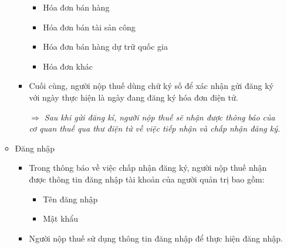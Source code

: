 \begin{itemize}
\begin{itemize}
\begin{itemize}
\begin{itemize}
                                  \item Hóa đơn bán hàng

                                  \item Hóa đơn bán tài sản công

                                  \item Hóa đơn bán hàng dự trữ quốc gia

                                  \item Hóa đơn khác


                              \end{itemize}

                        \item Cuối cùng, người nộp thuế dùng chữ ký số để xác nhận gửi đăng ký với ngày thực hiện là ngày đang đăng ký hóa đơn điện tử.

                              $\Rightarrow$ \emph{Sau khi gửi đăng kí, người nộp thuế sẽ nhận được thông báo của cơ quan thuế qua thư điện tử về việc tiếp nhận và chấp nhận đăng ký.}


                    \end{itemize}

              \item Đăng nhập

                    \begin{itemize}

                        \item Trong thông báo về việc chấp nhận đăng ký, người nộp thuế nhận được thông tin đăng nhập tài khoản của người quản trị bao gồm:

                              \begin{itemize}

                                  \item Tên đăng nhập

                                  \item Mật khẩu

                              \end{itemize}

                        \item Người nộp thuế sử dụng thông tin đăng nhập để thực hiện đăng nhập.


\end{itemize}
\end{itemize}
\end{itemize}
